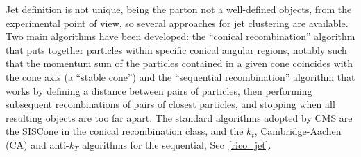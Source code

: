 Jet definition is not unique, being the parton not a well-defined objects, from the experimental point of view, so several
approaches for jet clustering are available. Two main algorithms have been developed: the ``conical recombination'' algorithm
that puts together particles within specific conical angular regions, notably such that
the momentum sum of the particles contained in a given cone coincides
with the cone axis (a ``stable cone'') and
the ``sequential recombination'' algorithm   that works by defining a distance
between pairs of particles, then performing subsequent recombinations of pairs of closest
particles, and stopping when all resulting objects are too far apart. The standard algorithms adopted by
CMS are the SISCone in the conical recombination class, and the $k_t$, Cambridge-Aachen (CA) and anti-$k_T$ algorithms for the sequential, Sec~\ref{rico_jet}.\\
\newline
